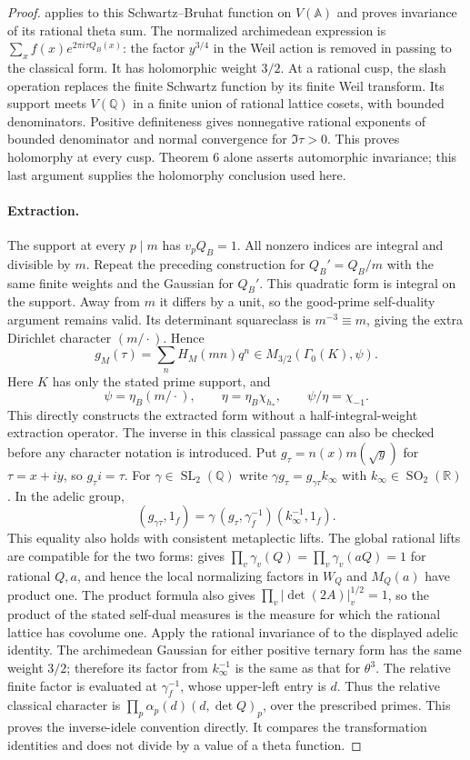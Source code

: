 \begin{proof}
\cite[III, Theorem 6]{weil} applies to this Schwartz--Bruhat function on
$V(\mathbb A)$ and proves invariance of its rational theta sum.
The normalized archimedean expression is
$\sum_x f(x)e^{2\pi i\tau Q_B(x)}$: the factor $y^{3/4}$ in the
Weil action is removed in passing to the classical form.
It has holomorphic weight $3/2$.  At a rational cusp, the slash
operation replaces the finite Schwartz function by its finite
Weil transform.  Its support meets $V(\mathbb Q)$ in a finite
union of rational lattice cosets, with bounded denominators.
Positive definiteness gives nonnegative rational exponents of
bounded denominator and normal convergence for $\Im\tau>0$.
This proves holomorphy at every cusp.  Theorem 6 alone asserts
automorphic invariance; this last argument supplies the
holomorphy conclusion used here.

\paragraph{Extraction.}
The support at every $p\mid m$ has $v_pQ_B=1$.  All nonzero
indices are integral and divisible by $m$.  Repeat the preceding
construction for $Q_B'=Q_B/m$ with the same finite weights and the
Gaussian for $Q_B'$.  This quadratic form is integral on the
support.  Away from $m$ it differs by a unit, so the good-prime
self-duality argument remains valid.  Its determinant squareclass
is $m^{-3}\equiv m$, giving the extra Dirichlet character
$(m/\cdot)$.  Hence
\[
 g_M(\tau)=\sum_n H_M(mn)q^n\in
      M_{3/2}(\Gamma_0(K),\psi).
\]
Here $K$ has only the stated prime support, and
\[
 \psi=\eta_B(m/\cdot),\qquad
 \eta=\eta_B\chi_{h_*},\qquad
 \psi/\eta=\chi_{-1}. \tag{O.5}
\]
This directly constructs the extracted form without a
half-integral-weight extraction operator.
The inverse in this classical passage can also be checked before
any character notation is introduced. Put
$g_\tau=n(x)m(\sqrt y)$ for $\tau=x+iy$, so $g_\tau i=\tau$.
For $\gamma\in\operatorname{SL}_2(\mathbb Q)$ write
$\gamma g_\tau=g_{\gamma\tau}k_\infty$ with
$k_\infty\in\operatorname{SO}_2(\mathbb R)$. In the adelic group,
\[
 (g_{\gamma\tau},1_f)
   =\gamma\,(g_\tau,\gamma_f^{-1})(k_\infty^{-1},1_f).
\]
This equality also holds with consistent metaplectic lifts.
The global rational lifts are compatible for the two forms:
\cite[II.30, Proposition~5]{weil} gives
$\prod_v\gamma_v(Q)=\prod_v\gamma_v(aQ)=1$ for rational $Q,a$,
and hence the local normalizing factors in $W_Q$ and $M_Q(a)$
have product one. The product formula also gives
$\prod_v|\det(2A)|_v^{1/2}=1$, so the product of the stated
self-dual measures is the measure for which the rational lattice
has covolume one. Apply the rational invariance of
\cite[III.41, Theorem~6]{weil} to the displayed adelic identity.
The archimedean Gaussian for either positive ternary form has
the same weight $3/2$; therefore its factor from $k_\infty^{-1}$
is the same as that for $\theta^3$. The relative finite factor
is evaluated at $\gamma_f^{-1}$, whose upper-left entry is $d$.
Thus the relative classical character is
$\prod_p\alpha_p(d)(d,\det Q)_p$, over the prescribed primes.
This proves the inverse-idele convention directly. It compares
the transformation identities and does not divide by a value
of a theta function.


\end{proof}
